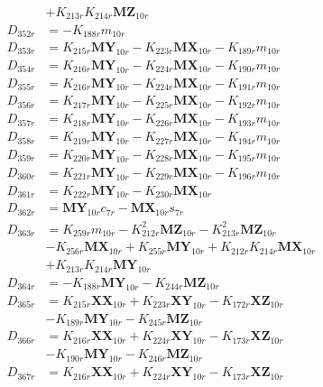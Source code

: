 \begin{multicols}{2}
\begin{align}
&+ K_{213r}K_{214r}\mathbf{MZ}_{10r} \nonumber \\
D_{352r} &= -K_{188r}m_{10r} \nonumber \\
D_{353r} &= K_{215r}\mathbf{MY}_{10r} - K_{223r}\mathbf{MX}_{10r} - K_{189r}m_{10r} \nonumber \\
D_{354r} &= K_{216r}\mathbf{MY}_{10r} - K_{224r}\mathbf{MX}_{10r} - K_{190r}m_{10r} \nonumber \\
D_{355r} &= K_{216r}\mathbf{MY}_{10r} - K_{224r}\mathbf{MX}_{10r} - K_{191r}m_{10r} \nonumber \\
D_{356r} &= K_{217r}\mathbf{MY}_{10r} - K_{225r}\mathbf{MX}_{10r} - K_{192r}m_{10r} \nonumber \\
D_{357r} &= K_{218r}\mathbf{MY}_{10r} - K_{226r}\mathbf{MX}_{10r} - K_{193r}m_{10r} \nonumber \\
D_{358r} &= K_{219r}\mathbf{MY}_{10r} - K_{227r}\mathbf{MX}_{10r} - K_{194r}m_{10r} \nonumber \\
D_{359r} &= K_{220r}\mathbf{MY}_{10r} - K_{228r}\mathbf{MX}_{10r} - K_{195r}m_{10r} \nonumber \\
D_{360r} &= K_{221r}\mathbf{MY}_{10r} - K_{229r}\mathbf{MX}_{10r} - K_{196r}m_{10r} \nonumber \\
D_{361r} &= K_{222r}\mathbf{MY}_{10r} - K_{230r}\mathbf{MX}_{10r} \nonumber \\
D_{362r} &= \mathbf{MY}_{10r}c_{7r} - \mathbf{MX}_{10r}s_{7r} \nonumber \\
D_{363r} &= K_{259r}m_{10r} - K_{212r}^2\mathbf{MZ}_{10r} - K_{213r}^2\mathbf{MZ}_{10r}  \nonumber \\
&- K_{256r}\mathbf{MX}_{10r} + K_{255r}\mathbf{MY}_{10r} + K_{212r}K_{214r}\mathbf{MX}_{10r}  \nonumber \\
&+ K_{213r}K_{214r}\mathbf{MY}_{10r} \nonumber \\
D_{364r} &= - K_{188r}\mathbf{MY}_{10r} - K_{244r}\mathbf{MZ}_{10r} \nonumber \\
D_{365r} &= K_{215r}\mathbf{XX}_{10r} + K_{223r}\mathbf{XY}_{10r} - K_{172r}\mathbf{XZ}_{10r}  \nonumber \\
&- K_{189r}\mathbf{MY}_{10r} - K_{245r}\mathbf{MZ}_{10r} \nonumber \\
D_{366r} &= K_{216r}\mathbf{XX}_{10r} + K_{224r}\mathbf{XY}_{10r} - K_{173r}\mathbf{XZ}_{10r}  \nonumber \\
&- K_{190r}\mathbf{MY}_{10r} - K_{246r}\mathbf{MZ}_{10r} \nonumber \\
D_{367r} &= K_{216r}\mathbf{XX}_{10r} + K_{224r}\mathbf{XY}_{10r} - K_{173r}\mathbf{XZ}_{10r}  \nonumber \\

\end{align}
\end{multicols}
